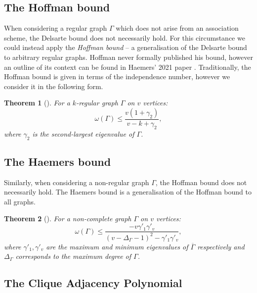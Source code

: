 \documentclass[11pt, baustms]{amsproc}
\theoremstyle{scplain}
\newtheorem{theorem}{Theorem}[section]
\renewcommand\le{\leqslant}
\begin{document}
	\subsection{The Hoffman bound}

    When considering a regular graph $\Gamma$ which does not arise from an association scheme, the Delsarte bound does not necessarily hold. For this circumstance we could instead apply the \emph{Hoffman bound} -- a generalisation of the Delsarte bound to arbitrary regular graphs. Hoffman never formally published his bound, however an outline of its context can be found in Haemers' 2021 paper \cite{haemers_hoffmans_2021}. Traditionally, the Hoffman bound is given in terms of the independence number, however we consider it in the following form.
    
\begin{theorem}[{\cite[Theorem 1]{haemers_hoffmans_2021}}]
	\label{HBB}	
	For a $k$-regular graph $\Gamma$ on $v$ vertices:
	\begin{equation*}
		\omega(\Gamma) \le \frac{v(1+\gamma_2)}{v-k+\gamma_2}, %
	\end{equation*}
    where $\gamma_2$ is the second-largest eigenvalue of $\Gamma$.
\end{theorem}


   \subsection{The Haemers bound}
   
Similarly, when considering a non-regular graph $\Gamma$, the Hoffman bound does not necessarily hold. The Haemers bound is a generalisation of the Hoffman bound to all graphs.

\begin{theorem}[{\cite[2.1.3]{thesis}}]\label{HaB}
	For a non-complete graph $\Gamma$ on $v$ vertices: 
	\begin{equation*} 
		\omega(\Gamma) \le \frac{-v \gamma'_1\gamma'_{v}}{(v-\Delta_\Gamma-1)^2-\gamma'_1\gamma'_{v}},
	\end{equation*}
	where $\gamma'_1, \gamma'_{v}$ are the maximum and minimum eigenvalues of $\overline{\Gamma}$ respectively and $\Delta_\Gamma$ corresponds to the maximum degree of $\Gamma$.
\end{theorem}

\subsection{The Clique Adjacency Polynomial}
\end{document}
